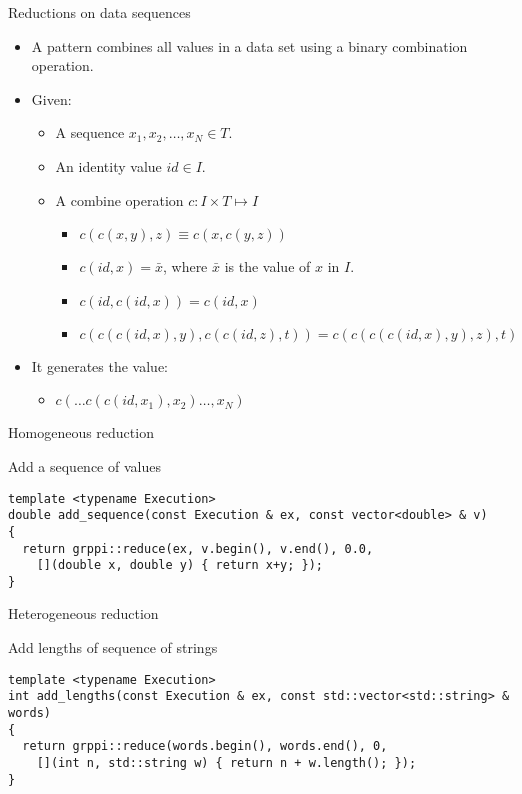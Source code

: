 \begin{frame}[t]{Reductions on data sequences}
\begin{itemize}
  \item A  pattern combines all values in a data set
        using a binary combination operation.
  \vfill
  \item Given:
    \begin{itemize}
      \item A sequence $x_1, x_2, \ldots, x_N \in T$.
      \item An identity value $id \in I$.
      \item A combine operation $c : I \times T \mapsto I$
        \begin{itemize}
          \item $c(c(x,y),z) \equiv c(x,c(y,z))$
          \item $c(id,x) = \bar{x}$, where $\bar{x}$ is the value of $x$ in $I$.
          \item $c(id,c(id,x)) = c(id,x)$
          \item $c(c(c(id,x),y),c(c(id,z),t)) = c(c(c(c(id,x),y),z),t)$
        \end{itemize}
    \end{itemize}
  \vfill
  \item It generates the value:
    \begin{itemize}
      \item $c(\ldots c(c(id,x_1), x_2) \ldots, x_N)$
    \end{itemize}
\end{itemize}
\end{frame}

\begin{frame}[t,fragile]{Homogeneous reduction}
\begin{block}{Add a sequence of values}
\begin{lstlisting}
template <typename Execution>
double add_sequence(const Execution & ex, const vector<double> & v)
{
  return grppi::reduce(ex, v.begin(), v.end(), 0.0,
    [](double x, double y) { return x+y; });
}
\end{lstlisting}
\end{block}
\end{frame}

\begin{frame}[t,fragile]{Heterogeneous reduction}
\begin{block}{Add lengths of sequence of strings}
\begin{lstlisting}
template <typename Execution>
int add_lengths(const Execution & ex, const std::vector<std::string> & words)
{
  return grppi::reduce(words.begin(), words.end(), 0,
    [](int n, std::string w) { return n + w.length(); });
}
\end{lstlisting}
\end{block}
\end{frame}
